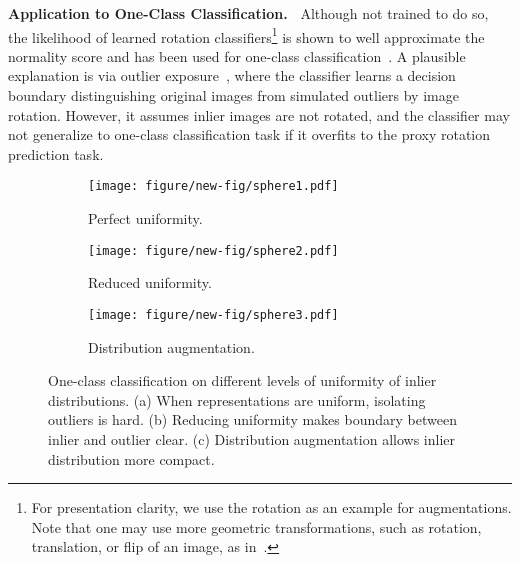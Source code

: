 \documentclass{article} \usepackage{iclr2021_conference,times}
\begin{document}
\textbf{Application to One-Class Classification.~}
Although not trained to do so, the likelihood of learned rotation classifiers\footnote{For presentation clarity, we use the rotation as an example for augmentations. Note that one may use more geometric transformations, such as rotation, translation, or flip of an image, as in~\cite{golan2018deep,hendrycks2019using,bergman2020classification}.}  is shown to well approximate the normality score and has been used for one-class classification~\citep{golan2018deep,hendrycks2019using,bergman2020classification}. A plausible explanation is via outlier exposure~\citep{hendrycks2018deep}, where the classifier learns a decision boundary distinguishing original images from simulated outliers by image rotation. However, it assumes inlier images are not rotated, and the classifier may not generalize to one-class classification task if it overfits to the proxy rotation prediction task. 










\begin{figure}[t]
    \centering
    \begin{subfigure}{.22\textwidth}
        \centering
        \texttt{[image: figure/new-fig/sphere1.pdf]}
    \caption{Perfect uniformity.}
    \label{fig:perfect_uniformity}
    \end{subfigure}
    \hspace{0.1in}
    \begin{subfigure}{.22\textwidth}
        \centering
        \texttt{[image: figure/new-fig/sphere2.pdf]}
    \caption{Reduced uniformity.}
    \label{fig:partial_uniformity}
    \end{subfigure}
    \hspace{0.15in}
    \begin{subfigure}{.33\textwidth}
        \centering
        \texttt{[image: figure/new-fig/sphere3.pdf]}
    \caption{Distribution augmentation.}
    \label{fig:da_contrast}
    \end{subfigure}
    \vspace{-0.1in}
    \caption{One-class classification on different levels of uniformity of inlier distributions. (a) When representations are uniform, isolating outliers is hard. (b) Reducing uniformity makes boundary between inlier and outlier clear. (c) Distribution augmentation allows inlier distribution more compact.}
    \label{fig:uniformity}
    \vspace{-0.2in}
\end{figure}
\end{document}
